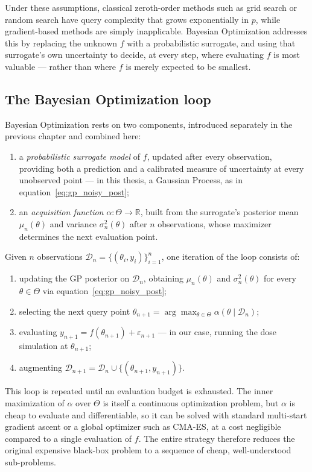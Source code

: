 \documentclass{article}
\begin{document}
	Under these assumptions, classical zeroth-order methods such as grid search or random search have query complexity that grows exponentially in $p$, while gradient-based methods are simply inapplicable. Bayesian Optimization addresses this by replacing the unknown $f$ with a probabilistic surrogate, and using that surrogate's own uncertainty to decide, at every step, where evaluating $f$ is most valuable — rather than where $f$ is merely expected to be smallest.
	
	\subsection{The Bayesian Optimization loop}
	
	Bayesian Optimization rests on two components, introduced separately in the previous chapter and combined here:
	\begin{enumerate}
		\item a \textit{probabilistic surrogate model} of $f$, updated after every observation, providing both a prediction and a calibrated measure of uncertainty at every unobserved point — in this thesis, a Gaussian Process, as in equation~\eqref{eq:gp_noisy_post};
		\item an \textit{acquisition function} $\alpha: \Theta \to \mathbb{R}$, built from the surrogate's posterior mean $\mu_n(\theta)$ and variance $\sigma_n^2(\theta)$ after $n$ observations, whose maximizer determines the next evaluation point.
	\end{enumerate}
	
	Given $n$ observations $\mathcal{D}_n = \{(\theta_i, y_i)\}_{i=1}^n$, one iteration of the loop consists of:
	\begin{enumerate}
		\item updating the GP posterior on $\mathcal{D}_n$, obtaining $\mu_n(\theta)$ and $\sigma_n^2(\theta)$ for every $\theta \in \Theta$ via equation~\eqref{eq:gp_noisy_post};
		\item selecting the next query point $\theta_{n+1} = \arg\max_{\theta \in \Theta} \alpha(\theta \mid \mathcal{D}_n)$;
		\item evaluating $y_{n+1} = f(\theta_{n+1}) + \varepsilon_{n+1}$ — in our case, running the dose simulation at $\theta_{n+1}$;
		\item augmenting $\mathcal{D}_{n+1} = \mathcal{D}_n \cup \{(\theta_{n+1}, y_{n+1})\}$.
	\end{enumerate}
	
	This loop is repeated until an evaluation budget is exhausted. The inner maximization of $\alpha$ over $\Theta$ is itself a continuous optimization problem, but $\alpha$ is cheap to evaluate and differentiable, so it can be solved with standard multi-start gradient ascent or a global optimizer such as CMA-ES, at a cost negligible compared to a single evaluation of $f$. The entire strategy therefore reduces the original expensive black-box problem to a sequence of cheap, well-understood sub-problems.
	
\end{document}

